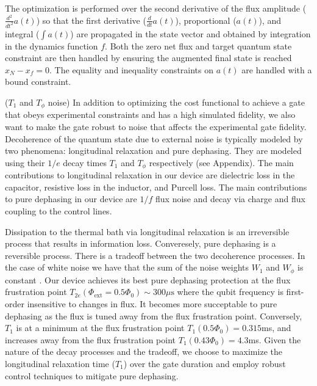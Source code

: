 \documentclass[
  amsfonts,
  amsmath,
  tbtags,
  amssymb,
  aps,
  nobibnotes,
  twocolumn,
]{revtex4-2}
\begin{document}
The optimization is performed
over the second derivative of the flux amplitude
($\frac{d^{2}}{dt^{2}} a(t)$) so that the first derivative
($\frac{d}{dt} a(t)$), proportional ($a(t)$), and integral ($\int a(t)$)
are propagated in the state vector and obtained by
integration in the dynamics function $f$.
Both the zero net flux and target quantum state constraint
are then handled by ensuring the augmented final state is
reached $x_{N} - x_{f} = 0$.
The equality and inequality constraints on $a(t)$ are handled
with a bound constraint.

($T_{1}$ and $T_{\phi}$ noise)
In addition to optimizing the cost functional to achieve a gate
that obeys experimental constraints and has a high simulated fidelity,
we also want to make the gate robust to noise that affects the experimental
gate fidelity. Decoherence of the quantum state due to external noise
is typically modeled by two phenomena: longitudinal relaxation and pure dephasing.
They are modeled using their $1/e$ decay times $T_{1}$ and $T_{\phi}$ respectively
(see Appendix).
The main contributions to longitudinal relaxation in our
device are dielectric loss in the capacitor, resistive loss in the inductor,
and Purcell loss. The main contributions to pure dephasing in our
device are $1/f$ flux noise and decay via charge and flux coupling
to the control lines.

Dissipation to the thermal bath via longitudinal
relaxation is an irreversible process
that results in information loss.
Converesely, pure dephasing is a reversible process.
There is a tradeoff between the two decoherence processes. In the case of white
noise we have that the sum of the noise weights $W_{1}$ and $W_{\phi}$
is constant \cite{huang2020engineering}.
Our device achieves its best pure dephasing
protection at the flux frustration point
$T_{2e}(\Phi_{\textrm{ext}} = 0.5 \Phi_{0}) \sim 300 \mu\textrm{s}$
where the qubit frequency is first-order insensitive to changes in flux.
It becomes more succeptable to pure dephasing as the flux is tuned away from the flux
frustration point. Conversely, $T_{1}$ is at a minimum
at the flux frustration point $T_{1}(0.5 \Phi_{0}) = 0.315$ms,
and increases away from the flux frustration point
$T_{1}(0.43 \Phi_{0}) = 4.3$ms. Given the nature
of the decay processes and the tradeoff, we choose
to maximize the longitudinal relaxation time ($T_{1}$)
over the gate duration
and employ robust control techniques to mitigate
pure dephasing.
\end{document}
